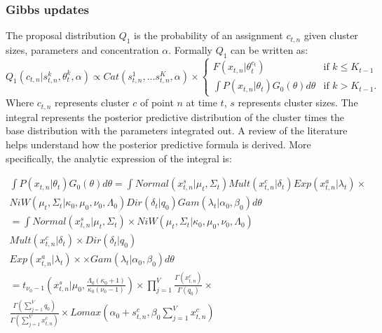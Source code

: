 \documentclass[twoside,hidelinks]{article}
\begin{document}
\subsubsection{Gibbs updates}
The proposal distribution $Q_1$ is the probability of an assignment $c_{t,n}$ given cluster sizes, parameters and concentration $\alpha$. Formally $Q_1$ can be written as:
\begin{equation} \label{Gibbs}
 Q_1(c_{t,n} | s_{t,n}^k, \theta_t^k, \alpha) \propto Cat( s_{t,n}^1,...s_{t,n}^K, \alpha ) \times
 	\begin{cases} 
 	F(x_{t,n} | \theta_t^{c_t} )  &\mbox{if } k \leq K_{t-1} \\
 	\int P(x_{t,n} | \theta_t )G_0(\theta) d\theta & \mbox{if } k > K_{t-1}. \end{cases}
\end{equation}
Where $c_{t,n}$ represents cluster $c$ of point $n$ at time $t$, $s$ represents cluster sizes. The integral represents the posterior predictive distribution of the cluster times the base distribution with the parameters integrated out. A review of the literature helps understand how the posterior predictive formula is derived. More specifically, the analytic expression of the integral is:


\begin{equation} \label{Q1}
	\begin{split}
		 	\int P(x_{t,n} | \theta_t )G_0(\theta) d\theta =
		 	\int Normal(x_{t,n}^s| \mu_t, \Sigma_t) Mult(x_{t,n}^c | \delta_t) Exp(x_{t,n}^a | \lambda_t) \times  \\ NiW( \mu_t, \Sigma_t | \kappa_0, \mu_0, \nu_0, \Lambda_0 ) Dir(\delta_t | q_0) Gam( \lambda_t | \alpha_0, \beta_0)  d\theta  \\
			= \int Normal(x_{t,n}^s| \mu_t, \Sigma_t) \times NiW( \mu_t, \Sigma_t | \kappa_0, \mu_0, \nu_0, \Lambda_0 )\\
			 Mult(x_{t,n}^c | \delta_t) \times Dir(\delta_t | q_0) \\
			 Exp(x_{t,n}^a | \lambda_t) \times  \times Gam( \lambda_t | \alpha_0, \beta_0)  d\theta  \\
		 	= t_{\nu_0-1}( x_{t,n}^s | \mu_0, \frac{\Lambda_0(\kappa_0+1)}{\kappa_0(\nu_0-1)}) \times \prod_{j=1}^V \frac{\Gamma(x_{t,n}^c)}{\Gamma(q_0)} \times \\ \frac{\Gamma(\sum_{j=1}^V q_0)}{\Gamma(\sum_{j=1}^V x_{t,n}^c)} \times Lomax(\alpha_0 + s_{t,n}^c, \beta_0 \sum_{j=1}^V x_{t,n}^c)
 	\end{split}
\end{equation}
\end{document}
